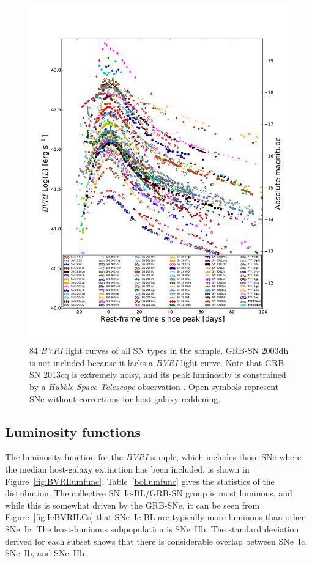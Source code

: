 \documentclass[a4paper,fleqn,usenatbib]{mnras}
\begin{document}
\begin{figure}
\centering
\includegraphics[scale=0.7]{BVRI_Bolometric_LCs.pdf}
\caption{84 \textit{BVRI} light curves of all SN types in the sample. GRB-SN 2003dh is not included because it lacks a \textit{BVRI} light curve. Note that GRB-SN 2013cq is extremely noisy, and its peak luminosity is constrained by a {\it Hubble Space Telescope} observation \citep{Melandri2014}. Open symbols represent SNe without corrections for host-galaxy reddening.}
\label{fig:BVRILCs}
\end{figure}

\subsection{Luminosity functions}
The luminosity function \citep[see, for example,][]{Li2011} for the \textit{BVRI} sample, which includes those SNe where the median host-galaxy extinction has been included, is shown in Figure~\ref{fig:BVRIlumfunc}. Table~\ref{bollumfunc} gives the statistics of the distribution. The collective SN~Ic-BL/GRB-SN group is most luminous, and while this is somewhat driven by the GRB-SNe, it can be seen from Figure~\ref{fig:IcBVRILCs} that SNe~Ic-BL are typically more luminous than other SNe~Ic. The least-luminous subpopulation is SNe~IIb. The standard deviation derived for each subset shows that there is considerable overlap between SNe~Ic, SNe~Ib, and SNe~IIb. 
\end{document}

